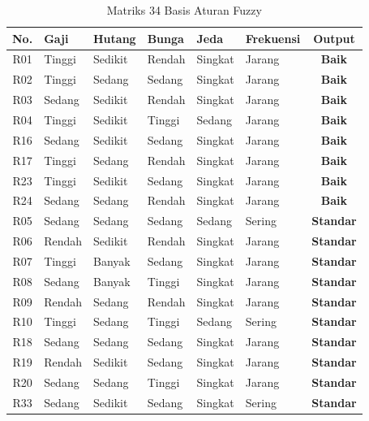 \documentclass[12pt,a4paper]{report}
\begin{document}
\begin{table}[H]
  \centering
  \caption{Matriks 34 Basis Aturan Fuzzy}
  \label{tab:rule_base}
  \renewcommand{\arraystretch}{1.1}
  \small
  \begin{tabular}{|c|l|l|l|l|l|c|}
    \hline
    \textbf{No.} & \textbf{Gaji} & \textbf{Hutang} &
    \textbf{Bunga} & \textbf{Jeda} & \textbf{Frekuensi} &
    \textbf{Output} \\
    \hline
    R01 & Tinggi & Sedikit & Rendah & Singkat & Jarang    & \textbf{Baik} \\ \hline
    R02 & Tinggi & Sedang  & Sedang & Singkat & Jarang    & \textbf{Baik} \\ \hline
    R03 & Sedang & Sedikit & Rendah & Singkat & Jarang    & \textbf{Baik} \\ \hline
    R04 & Tinggi & Sedikit & Tinggi & Sedang  & Jarang    & \textbf{Baik} \\ \hline
    R16 & Sedang & Sedikit & Sedang & Singkat & Jarang    & \textbf{Baik} \\ \hline
    R17 & Tinggi & Sedang  & Rendah & Singkat & Jarang    & \textbf{Baik} \\ \hline
    R23 & Tinggi & Sedikit & Sedang & Singkat & Jarang    & \textbf{Baik} \\ \hline
    R24 & Sedang & Sedang  & Rendah & Singkat & Jarang    & \textbf{Baik} \\ \hline
    R05 & Sedang & Sedang  & Sedang & Sedang  & Sering    & \textbf{Standar} \\ \hline
    R06 & Rendah & Sedikit & Rendah & Singkat & Jarang    & \textbf{Standar} \\ \hline
    R07 & Tinggi & Banyak  & Sedang & Singkat & Jarang    & \textbf{Standar} \\ \hline
    R08 & Sedang & Banyak  & Tinggi & Singkat & Jarang    & \textbf{Standar} \\ \hline
    R09 & Rendah & Sedang  & Rendah & Singkat & Jarang    & \textbf{Standar} \\ \hline
    R10 & Tinggi & Sedang  & Tinggi & Sedang  & Sering    & \textbf{Standar} \\ \hline
    R18 & Sedang & Sedang  & Sedang & Singkat & Jarang    & \textbf{Standar} \\ \hline
    R19 & Rendah & Sedikit & Sedang & Singkat & Jarang    & \textbf{Standar} \\ \hline
    R20 & Sedang & Sedang  & Tinggi & Singkat & Jarang    & \textbf{Standar} \\ \hline
    R33 & Sedang & Sedikit & Sedang & Singkat & Sering    & \textbf{Standar} \\ \hline

\end{tabular}
\end{table}
\end{document}
